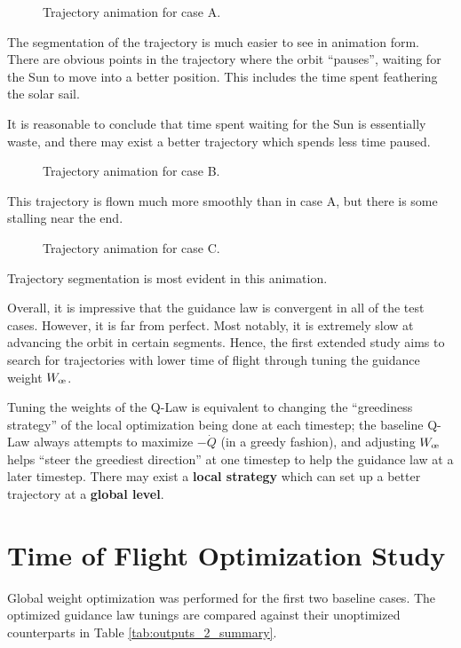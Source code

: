 \begin{figure}[H]
    \caption{Trajectory animation for case A.}
    \label{fig:anim_a}
\end{figure}
The segmentation of the trajectory is much easier to see in animation form. There are obvious points in the trajectory where the orbit ``pauses'', waiting for the Sun to move into a better position. This includes the time spent feathering the solar sail.

It is reasonable to conclude that time spent waiting for the Sun is essentially waste, and there may exist a better trajectory which spends less time paused.
\begin{figure}[H]
    \caption{Trajectory animation for case B.}
    \label{fig:anim_b}
\end{figure}

This trajectory is flown much more smoothly than in case A, but there is some stalling near the end.

\begin{figure}[H]
    \caption{Trajectory animation for case C.}
    \label{fig:anim_c}
\end{figure}
Trajectory segmentation is most evident in this animation.

Overall, it is impressive that the guidance law is convergent in all of the test cases. However, it is far from perfect. Most notably, it is extremely slow at advancing the orbit in certain segments. Hence, the first extended study aims to search for trajectories with lower time of flight through tuning the guidance weight \(W_{\moe}\).

Tuning the weights of the Q-Law is equivalent to changing the ``greediness strategy'' of the local optimization being done at each timestep; the baseline Q-Law always attempts to maximize \(-\dot{Q}\) (in a greedy fashion), and adjusting \(W_{\moe}\) helps ``steer the greediest direction'' at one timestep to help the guidance law at a later timestep. There may exist a \textbf{local strategy} which can set up a better trajectory at a \textbf{global level}.


\newpage
\section{Time of Flight Optimization Study}
Global weight optimization was performed for the first two baseline cases. The optimized guidance law tunings are compared against their unoptimized counterparts in Table \ref{tab:outputs_2_summary}.

